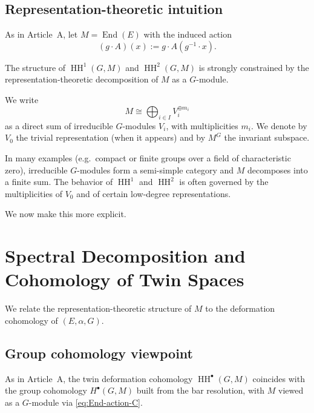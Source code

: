 \documentclass[11pt,a4paper]{article}
\numberwithin{equation}{section}
\DeclareMathOperator{\End}{End}
\DeclareMathOperator{\HH}{HH}
\newcommand{\TwinSpace}{(E,\alpha,G)}
\begin{document}
	\subsection{Representation-theoretic intuition}
	
	As in Article~A, let $M=\End(E)$ with the induced action
	\begin{equation}\label{eq:End-action-C}
		(g\cdot A)(x) := g\cdot A(g^{-1}\cdot x).
	\end{equation}
	
	The structure of $\HH^1(G,M)$ and $\HH^2(G,M)$ is strongly constrained by the
	representation-theoretic decomposition of $M$ as a $G$-module.
	
	\begin{definition}
		We write
		\[
		M \cong \bigoplus_{i\in I} V_i^{\oplus m_i}
		\]
		as a direct sum of irreducible $G$-modules $V_i$, with multiplicities $m_i$.
		We denote by $V_0$ the trivial representation (when it appears) and by $M^{G}$ the invariant subspace.
	\end{definition}
	
	\begin{remark}
		In many examples (e.g.\ compact or finite groups over a field of characteristic zero),
		irreducible $G$-modules form a semi-simple category and $M$ decomposes into a finite sum.
		The behavior of $\HH^1$ and $\HH^2$ is often governed by the multiplicities of $V_0$
		and of certain low-degree representations.
	\end{remark}
	
	We now make this more explicit.
	
	\section{Spectral Decomposition and Cohomology of Twin Spaces}
	\label{sec:rep-theory}
	
	We relate the representation-theoretic structure of $M$ to the deformation cohomology of $\TwinSpace$.
	
	\subsection{Group cohomology viewpoint}
	
	As in Article~A, the twin deformation cohomology $\HH^\bullet(G,M)$ coincides with the group cohomology
	$H^\bullet(G,M)$ built from the bar resolution, with $M$ viewed as a $G$-module via \eqref{eq:End-action-C}.
	
\end{document}
